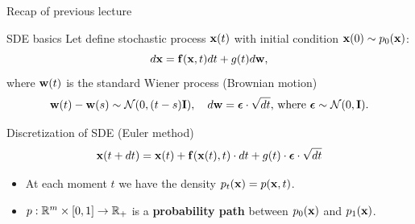 


\begin{frame}
\titlepage
\end{frame}
\begin{frame}{Recap of previous lecture}
	\vspace{-0.2cm}
	\begin{block}{SDE basics}
		Let define stochastic process $\mathbf{x}(t)$ with initial condition $\mathbf{x}(0) \sim p_0(\mathbf{x})$:
		\[
			d\mathbf{x} = \mathbf{f}(\mathbf{x}, t) dt + g(t) d \mathbf{w}, 
		\]
		where $\mathbf{w}(t)$ is the standard Wiener process (Brownian motion)
		\vspace{-0.2cm}
		\[		
			\mathbf{w}(t) - \mathbf{w}(s) \sim \mathcal{N}(0, (t - s) \mathbf{I}), \quad d \mathbf{w} = \boldsymbol{\epsilon} \cdot \sqrt{dt}, \, \text{where } \boldsymbol{\epsilon} \sim \mathcal{N}(0, \mathbf{I}).
		\]
	\end{block}
	\vspace{-0.3cm}
	\begin{block}{Discretization of SDE (Euler method)}
		\vspace{-0.3cm}
		\[
			\mathbf{x}(t + dt) = \mathbf{x}(t) + \mathbf{f}(\mathbf{x}(t), t) \cdot dt + g(t) \cdot \boldsymbol{\epsilon} \cdot \sqrt{dt}
		\]
		\vspace{-0.3cm}
	\end{block}
	\begin{itemize}
		\item At each moment $t$ we have the density $p_t(\mathbf{x}) = p(\mathbf{x}, t)$.
		\item $p: \mathbb{R}^m \times [0, 1] \rightarrow \mathbb{R}_+$ is a \textbf{probability path} between $p_0(\mathbf{x})$ and $p_1(\mathbf{x})$.
	\end{itemize}
\end{frame}
